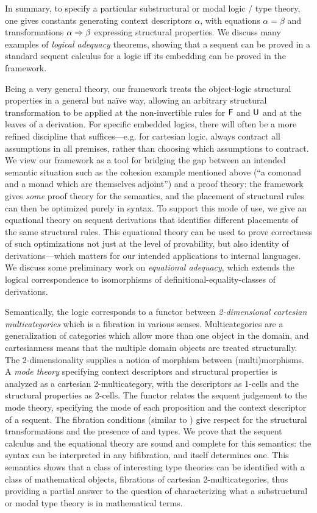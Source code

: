 In summary, to specify a particular substructural or modal logic / type
theory, one gives constants generating context descriptors $\alpha$,
with equations $\alpha = \beta$ and transformations $\alpha \Rightarrow \beta$
expressing structural properties.  We discuss many examples of
\emph{logical adequacy} theorems, showing that a sequent can be proved
in a standard sequent calculus for a logic iff its embedding can be
proved in the framework.  

Being a very general theory, our framework treats the object-logic
structural properties in a general but na\"ive way, allowing an
arbitrary structural transformation to be applied at the non-invertible
rules for $\mathsf{F}$ and $\mathsf{U}$ and at the leaves of a derivation.
For specific embedded logics, there will often be a more refined
discipline that suffices---e.g. for cartesian logic, always contract all
assumptions in all premises, rather than choosing which assumptions to
contract.  We view our framework as a tool for bridging the gap between
an intended semantic situation such as the cohesion example mentioned
above (``a comonad and a monad which are themselves adjoint'') and a
proof theory: the framework gives \emph{some} proof theory for the
semantics, and the placement of structural rules can then be optimized
purely in syntax.  To support this mode of use, we give an equational
theory on sequent derivations that identifies different placements of
the same structural rules.  This equational theory can be used to prove
correctness of such optimizations not just at the level of provability,
but also identity of derivations---which matters for our intended
applications to internal languages.  We discuss some preliminary work on
\emph{equational adequacy}, which extends the logical correspondence to
isomorphisms of definitional-equality-classes of derivations.

Semantically, the logic corresponds to a functor between
\emph{2-dimensional cartesian multicategories} which is a fibration in
various senses.  Multicategories are a generalization of categories
which allow more than one object in the domain, and cartesianness means
that the multiple domain objects are treated structurally.  The
2-dimensionality supplies a notion of morphism between (multi)morphisms.
A \emph{mode theory} specifying context descriptors and structural
properties is analyzed as a cartesian 2-multicategory, with the
descriptors as 1-cells and the structural properties as 2-cells.  The
functor relates the sequent judgement to the mode theory, specifying the
mode of each proposition and the context descriptor of a sequent.  The
fibration conditions (similar to
\citep{hermida02fibrations,hormann15multicategories}) give respect for
the structural transformations and the presence of  and 
types.  We prove that the sequent calculus and the equational theory are
sound and complete for this semantics: the syntax can be interpreted in
any bifibration, and itself determines one.  This semantics shows that a
class of interesting type theories can be identified with a class of
mathematical objects, fibrations of cartesian 2-multicategories, thus
providing a partial answer to the question of characterizing what a
substructural or modal type theory is in mathematical terms.

